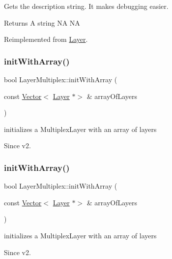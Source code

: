 Gets the description string. It makes debugging easier. \begin{DoxyReturn}{Returns}
A string  NA  NA 
\end{DoxyReturn}


Reimplemented from \hyperlink{classLayer_acadcdf383e0bf892c95213a4f7725672}{Layer}.

\mbox{\label{classLayerMultiplex_a36ddbf3e48d1d5176ca4ed0be4fff2b2}} 
\subsubsection{\texorpdfstring{init\+With\+Array()}{initWithArray()}\hspace{0.1cm}{\footnotesize\ttfamily [1/2]}}
{\footnotesize\ttfamily bool Layer\+Multiplex\+::init\+With\+Array (\begin{DoxyParamCaption}\item[{const \hyperlink{classVector}{Vector}$<$ \hyperlink{classLayer}{Layer} $\ast$$>$ \&}]{array\+Of\+Layers }\end{DoxyParamCaption})}

initializes a Multiplex\+Layer with an array of layers \begin{DoxySince}{Since}
v2. 
\end{DoxySince}
\mbox{\label{classLayerMultiplex_a36ddbf3e48d1d5176ca4ed0be4fff2b2}} 
\subsubsection{\texorpdfstring{init\+With\+Array()}{initWithArray()}\hspace{0.1cm}{\footnotesize\ttfamily [2/2]}}
{\footnotesize\ttfamily bool Layer\+Multiplex\+::init\+With\+Array (\begin{DoxyParamCaption}\item[{const \hyperlink{classVector}{Vector}$<$ \hyperlink{classLayer}{Layer} $\ast$$>$ \&}]{array\+Of\+Layers }\end{DoxyParamCaption})}

initializes a Multiplex\+Layer with an array of layers \begin{DoxySince}{Since}
v2. 
\end{DoxySince}
\mbox{\label{classLayerMultiplex_a9ad4fc1963d1a2a8fd1a41518e2c469b}} 
